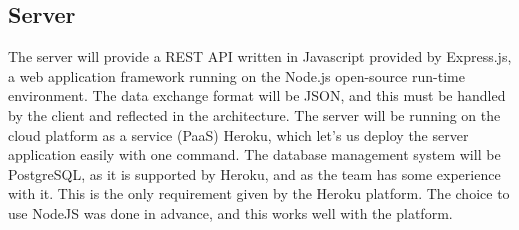 \subsection{Server}
The server will provide a REST API written in Javascript provided by Express.js, a web application framework running on the Node.js open-source run-time environment. The data exchange format will be JSON, and this must be handled by the client and reflected in the architecture. The server will be running on the cloud platform as a service (PaaS) Heroku\cite{heroku}, which let's us deploy the server application easily with one command. The database management system will be PostgreSQL\cite{postgresql}, as it is supported by Heroku, and as the team has some experience with it. This is the only requirement given by the Heroku platform. The choice to use NodeJS was done in advance, and this works well with the platform. 









